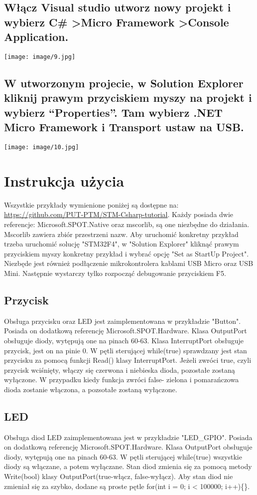﻿\documentclass{article}
\begin{document}
\subsection{Włącz Visual studio utworz nowy projekt i wybierz C\# \textgreater Micro Framework \textgreater Console Application.}

\texttt{[image: image/9.jpg]}
\subsection{W utworzonym projecie, w Solution Explorer kliknij prawym przyciskiem myszy na projekt i wybierz “Properties”. Tam wybierz .NET Micro Framework i Transport ustaw na USB.}
\texttt{[image: image/10.jpg]}

\section{Instrukcja użycia}
Wszystkie przykłady wymienione poniżej są dostępne na:  \href{https://github.com/PUT-PTM/STM-Csharp-tutorial}{https://github.com/PUT-PTM/STM-Csharp-tutorial}. Każdy posiada dwie referencje: Microsoft.SPOT.Native oraz mscorlib, są one niezbędne do działania. Mscorlib zawiera zbiór przestrzeni nazw. Aby uruchomić konkretny przykład trzeba uruchomić solucję "STM32F4", w "Solution Explorer" kliknąć prawym przyciskiem myszy konkretny przykład i wybrać opcję "Set as StartUp Project". Niezbęde jest również podłączenie mikrokontrolera kablami USB Micro oraz USB Mini. Następnie wystarczy tylko rozpocząć debugowanie przyciskiem F5.

\subsection{Przycisk}
Obsługa przycisku oraz LED jest zaimplementowana w przykładzie "Button". Posiada on dodatkową referencję Microsoft.SPOT.Hardware. Klasa OutputPort obsługuje diody, wytępują one na pinach 60-63. Klasa InterruptPort obsługuje przycisk, jest on na pinie 0. W pętli sterującej while(true) sprawdzany jest stan przycisku za pomocą funkcji Read() klasy InterruptPort. Jeżeli zwróci true, czyli przycisk wciśnięty, włączy się czerwona i niebieska dioda, pozostałe zostaną wyłączone. W przypadku kiedy funkcja zwróci false- zielona i pomarańczowa dioda zostanie włączona, a pozsotałe zostaną wyłączone.

\subsection{LED}
Obsługa diod LED zaimplementowana jest w przykładzie "LED\_GPIO". Posiada on dodatkową referencję Microsoft.SPOT.Hardware. Klasa OutputPort obsługuje diody, wytępują one na pinach 60-63. W pętli sterującej while(true) wszystkie diody są włączane, a potem wyłączane. Stan diod zmienia się za pomocą metody Write(bool) klasy OutputPort(true-włącz, false-wyłącz). Aby stan diod nie zmieniał się za szybko, dodane są proste pętle for(int i = 0; i < 100000; i++)\{\}.
\end{document}
